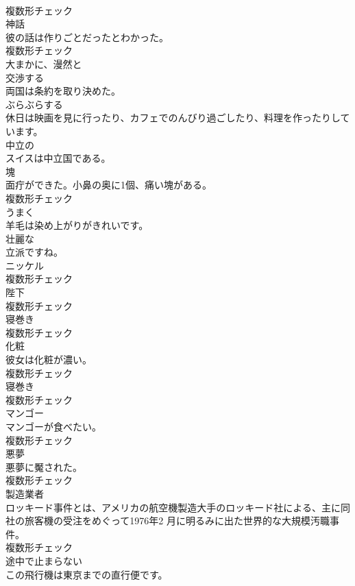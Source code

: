 \documentclass[8pt]{extreport}
\begin{document}
\begin{CJK}{UTF8}{min}
\\	複数形チェック
\\	[名詞]	神話	
\\	彼の話は作りごとだったとわかった。	
\\	複数形チェック
\\	[副詞]	大まかに、漫然と	
\\	[動詞]	交渉する	
\\	両国は条約を取り決めた。	
\\	[動詞]	ぶらぶらする	
\\	休日は映画を見に行ったり、カフェでのんびり過ごしたり、料理を作ったりしています。	
\\	[形容詞]	中立の	
\\	スイスは中立国である。	
\\	[名詞]	塊	
\\	面疔ができた。小鼻の奥に1個、痛い塊がある。	
\\	複数形チェック
\\	[副詞]	うまく	
\\	羊毛は染め上がりがきれいです。	
\\	[形容詞]	壮麗な	
\\	立派ですね。	
\\	[名詞]	ニッケル	
\\	複数形チェック
\\	[名詞]	陛下	
\\	複数形チェック
\\	[名詞]	寝巻き	
\\	複数形チェック
\\	[名詞]	化粧	
\\	彼女は化粧が濃い。	
\\	複数形チェック
\\	[名詞]	寝巻き	
\\	複数形チェック
\\	[名詞]	マンゴー	
\\	マンゴーが食べたい。	
\\	複数形チェック
\\	[名詞]	悪夢	
\\	悪夢に魘された。	
\\	複数形チェック
\\	[名詞]	製造業者	
\\	ロッキード事件とは、アメリカの航空機製造大手のロッキード社による、主に同社の旅客機の受注をめぐって1976年2 月に明るみに出た世界的な大規模汚職事件。	
\\	複数形チェック
\\	[形容詞]	途中で止まらない	
\\	この飛行機は東京までの直行便です。	

\end{CJK}
\end{document}
